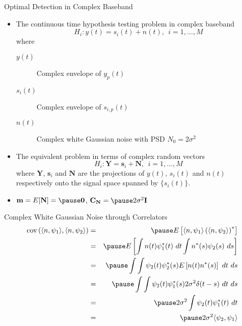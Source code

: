 \documentclass[t]{beamer}
\begin{document}
\begin{frame}{Optimal Detection in Complex Baseband}
  \footnotesize
  \begin{itemize}
    \item The continuous time hypothesis testing problem in complex baseband 
      \begin{equation*}
        H_i  :  y(t) = s_i(t) + n(t), \ \ i=1,\ldots,M
      \end{equation*}
      where
        \begin{description}
          \item[$y(t)$] Complex envelope of $y_p(t)$
          \item[$s_i(t)$] Complex envelope of $s_{i,p}(t)$
          \item[$n(t)$] Complex white Gaussian noise with PSD $N_0 = 2\sigma^2$
        \end{description}
    \item \pause The equivalent problem in terms of complex random vectors
      \begin{equation*}
        H_i  :  \mathbf{Y} = \mathbf{s}_i + \mathbf{N}, \ \ i=1,\ldots,M
      \end{equation*}
      where $\mathbf{Y}$, $\mathbf{s}_i$ and $\mathbf{N}$ are the projections of $y(t)$, $s_i(t)$ and $n(t)$ respectively onto the signal space spanned by $\{s_i(t)\}$.
    \item \pause $\mathbf{m} = E[\mathbf{N}] = \pause \mathbf{0}$, \pause $\mathbf{C_N} = \pause 2\sigma^2 \mathbf{I}$
  \end{itemize}
  \normalsize
\end{frame}

\begin{frame}{Complex White Gaussian Noise through Correlators}
  \footnotesize
  \begin{eqnarray*}
    \text{cov}\left( \langle n, \psi_1 \rangle, \langle n, \psi_2 \rangle \right) & = & \pause E\left[ \langle n, \psi_1 \rangle \left(\langle n, \psi_2 \rangle\right)^* \right] \\
    & = & \pause E \left[ \int n(t) \psi_1^*(t) \ dt \int n^*(s) \psi_2(s) \ ds \right] \\
    & = & \pause \int \int \psi_2(t) \psi_2^*(s) E\left[ n(t) n^*(s) \right] \ dt \ ds \\
    & = & \pause \int \int \psi_2(t) \psi_1^*(s) 2\sigma^2 \delta(t-s) \ dt \ ds \\
    & = & \pause 2\sigma^2 \int \psi_2(t) \psi_1^*(t) \ dt \\
    & = & \pause 2\sigma^2 \langle \psi_2, \psi_1 \rangle
  \end{eqnarray*}
  \normalsize
\end{frame}
\end{document}
